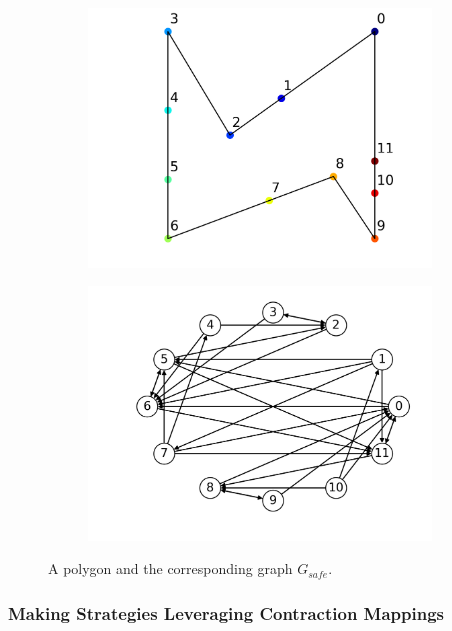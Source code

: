 \documentclass[]{styles/svproc}  %
\begin{document}
\begin{figure}
\centering
\begin{subfigure}{0.5\textwidth}
\centering
\includegraphics[width=\linewidth]{figures/simple_bit_inserted.png}
\end{subfigure}%
\begin{subfigure}{0.5\textwidth}
\centering
\includegraphics[width=\linewidth]{figures/simple_bit_safe_graph.png}
\end{subfigure}
\caption{A polygon and the corresponding graph $G_{safe}$. }
\label{fig:simple_bit}
\end{figure}

\subsubsection{Making Strategies Leveraging Contraction Mappings}
\end{document}
